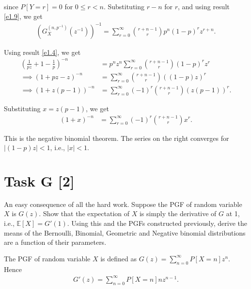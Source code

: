 since $P[Y=r]=0$ for $0\le r<n$. Substituting $r-n$ for $r$, and using result
\ref{e1.9}, we get
\begin{equation}
    \begin{aligned}
        \left(G_X^{(n, p^{-1})}(z^{-1})\right)^{-1} = \sum_{r=0}^\infty\binom{r+n
        -1}{r}p^n(1-p)^r z^{r+n}.
    \end{aligned}
    \label{e1.11}
\end{equation}

Using result \ref{e1.4}, we get
\begin{equation}
    \begin{aligned}
        \left(\frac{1}{pz}+1-\frac{1}{p}\right)^{-n} &=
        p^nz^n\sum_{r=0}^\infty\binom{r+n-1}{r}(1-p)^r z^r \\
        \implies (1+pz-z)^{-n} &= \sum_{r=0}^\infty\binom{r+n-1}{r}((1-p)z)^r \\
        \implies (1+z(p-1))^{-n} &= \sum_{r=0}^\infty(-1)^r\binom{r+n-1}{r}(z(p
        -1))^r.
    \end{aligned}
    \label{e1.12}
\end{equation}

Substituting $x=z(p-1)$, we get
\begin{equation}
    \begin{aligned}
        (1+x)^{-n} &= \sum_{r=0}^\infty(-1)^r\binom{r+n-1}{r}x^r.
    \end{aligned}
    \label{e1.13}
\end{equation}

This is the negative binomial theorem. The series on the right converges for $|(1-
p)z|<1$, i.e., $|x|<1$.


\section*{\colS{$\S$} Task G \hfill \normalfont \large [2]}

\begin{tcolorbox}
    An easy consequence of all the hard work. Suppose the PGF of random
    variable $X$ is $G(z)$. Show that the expectation of $X$ is simply the
    derivative of $G$ at 1, i.e., $\mathbb{E}[X] = G'(1)$. Using this and the PGFs
    constructed previously, derive the means of the Bernoulli, Binomial,
    Geometric and Negative binomial distributions are a function of their
    parameters.
\end{tcolorbox}


The PGF of random variable $X$ is defined as $G(z)=\sum_{n=0}^{\infty}P[X=n]z^n$.
Hence
\begin{equation}
    \begin{aligned}
        G'(z) = \sum_{n=0}^{\infty}P[X=n]nz^{n-1}.
    \end{aligned}
    \label{e1.14}
\end{equation}

